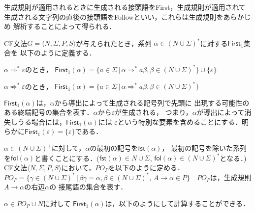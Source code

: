 \documentclass[a4j,dvipdfmx]{jbook}
\begin{document}
生成規則が適用されるときに生成される接頭語をFirst，生成規則が適用されて
生成される文字列の直後の接頭語をFollowといい，これらは生成規則をあらかじめ
解析することによって得られる．

\begin{Def}
  CF文法$G=\langle N,\Sigma,P,S\rangle$が与えられたとき，系列
  $\alpha\in(N\cup\Sigma)^\ast$に対する$\mathsf{First}_1$集合を
  以下のように定義する．
  \begin{list}{}{}
    \item $\alpha\Rightarrow^\ast\varepsilon$のとき，
    $\mathsf{First}_1(\alpha)=\{a\in\Sigma\,|\,
    \alpha\Rightarrow^\ast a\beta,\beta\in(N\cup\Sigma)^\ast\}\cup\{\varepsilon\}$
    \item $\alpha\not\Rightarrow^\ast\varepsilon$のとき，
    $\mathsf{First}_1(\alpha)=\{a\in\Sigma\,|\,
    \alpha\Rightarrow^\ast a\beta,\beta\in(N\cup\Sigma)^\ast\}$
  \end{list}
\end{Def}

$\mathsf{First}_1(\alpha)$は，$\alpha$から導出によって生成される記号列で先頭に
出現する可能性のある終端記号の集合を表す．$\alpha$から$\varepsilon$が生成される，
つまり，$\alpha$が導出によって消失しうる場合には，$\mathsf{First}_1(\alpha)$には
$\varepsilon$という特別な要素を含めることにする．明らかに$\mathsf{First}_1(\varepsilon)
=\{\varepsilon\}$である．

$\alpha\in(N\cup\Sigma)^+$に対して，$\alpha$の最初の記号を$\mathsf{fst}(\alpha)$，
最初の記号を除いた系列を$\mathsf{fol}(\alpha)$と書くことにする．($\mathsf{fst}(\alpha)\in
N\cup\Sigma$, $\mathsf{fol}(\alpha)\in(N\cup\Sigma)^\ast$となる．)
CF文法$\langle N,\Sigma,P,S\rangle$において，$PO_P$を以下のように定める．
$PO_P=\{\gamma\in(N\cup\Sigma)^\ast\,|\,\beta\gamma=\alpha, \beta\in(N\cup\Sigma)^\ast,\,
A\rightarrow\alpha\in P\}$　$PO_P$は，生成規則$A\rightarrow\alpha$の右辺$\alpha$の
接尾語の集合を表す．

$\alpha\in PO_P\cup N$に対して
$\mathsf{First}_1(\alpha)$は，以下のようにして計算することができる．
\end{document}
